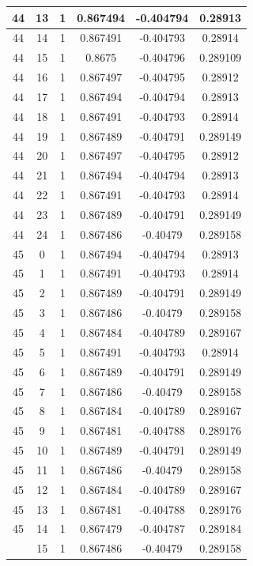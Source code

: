 \documentclass[12pt,a4paper]{article}
\numberwithin{equation}{section}
\numberwithin{figure}{section}
\numberwithin{table}{section}
\begin{document}
\begin{longtable}{|c|c|c|c|c|c|}
44 & 13 & 1 & 0.867494 & -0.404794 & 0.28913 \\ \hline
44 & 14 & 1 & 0.867491 & -0.404793 & 0.28914 \\ \hline
44 & 15 & 1 & 0.8675 & -0.404796 & 0.289109 \\ \hline
44 & 16 & 1 & 0.867497 & -0.404795 & 0.28912 \\ \hline
44 & 17 & 1 & 0.867494 & -0.404794 & 0.28913 \\ \hline
44 & 18 & 1 & 0.867491 & -0.404793 & 0.28914 \\ \hline
44 & 19 & 1 & 0.867489 & -0.404791 & 0.289149 \\ \hline
44 & 20 & 1 & 0.867497 & -0.404795 & 0.28912 \\ \hline
44 & 21 & 1 & 0.867494 & -0.404794 & 0.28913 \\ \hline
44 & 22 & 1 & 0.867491 & -0.404793 & 0.28914 \\ \hline
44 & 23 & 1 & 0.867489 & -0.404791 & 0.289149 \\ \hline
44 & 24 & 1 & 0.867486 & -0.40479 & 0.289158 \\ \hline
45 & 0 & 1 & 0.867494 & -0.404794 & 0.28913 \\ \hline
45 & 1 & 1 & 0.867491 & -0.404793 & 0.28914 \\ \hline
45 & 2 & 1 & 0.867489 & -0.404791 & 0.289149 \\ \hline
45 & 3 & 1 & 0.867486 & -0.40479 & 0.289158 \\ \hline
45 & 4 & 1 & 0.867484 & -0.404789 & 0.289167 \\ \hline
45 & 5 & 1 & 0.867491 & -0.404793 & 0.28914 \\ \hline
45 & 6 & 1 & 0.867489 & -0.404791 & 0.289149 \\ \hline
45 & 7 & 1 & 0.867486 & -0.40479 & 0.289158 \\ \hline
45 & 8 & 1 & 0.867484 & -0.404789 & 0.289167 \\ \hline
45 & 9 & 1 & 0.867481 & -0.404788 & 0.289176 \\ \hline
45 & 10 & 1 & 0.867489 & -0.404791 & 0.289149 \\ \hline
45 & 11 & 1 & 0.867486 & -0.40479 & 0.289158 \\ \hline
45 & 12 & 1 & 0.867484 & -0.404789 & 0.289167 \\ \hline
45 & 13 & 1 & 0.867481 & -0.404788 & 0.289176 \\ \hline
45 & 14 & 1 & 0.867479 & -0.404787 & 0.289184 \\ \hline
\pagebreak
45 & 15 & 1 & 0.867486 & -0.40479 & 0.289158 \\ \hline

\end{longtable}
\end{document}
